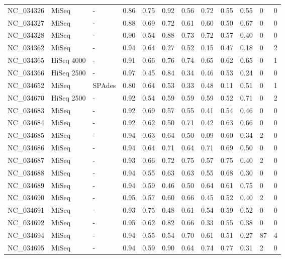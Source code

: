 \begin{table}[ht]
\begin{tabular}{llllllllllll}
  NC\_034326 & MiSeq & - & 0.86 & 0.75 & 0.92 & 0.56 & 0.72 & 0.55 & 0.55 &   0 &     0 \\ 
  NC\_034327 & MiSeq & - & 0.88 & 0.69 & 0.72 & 0.61 & 0.60 & 0.50 & 0.67 &   0 &     0 \\ 
  NC\_034328 & MiSeq & - & 0.90 & 0.54 & 0.88 & 0.73 & 0.72 & 0.57 & 0.40 &   0 &     0 \\ 
  NC\_034362 & MiSeq & - & 0.94 & 0.64 & 0.27 & 0.52 & 0.15 & 0.47 & 0.18 &   0 &     2 \\ 
  NC\_034365 & HiSeq 4000 & - & 0.91 & 0.66 & 0.76 & 0.74 & 0.65 & 0.62 & 0.65 &   0 &     1 \\ 
  NC\_034366 & HiSeq 2500 & - & 0.97 & 0.45 & 0.84 & 0.34 & 0.46 & 0.53 & 0.24 &   0 &     0 \\ 
  NC\_034652 & MiSeq & SPAdes & 0.80 & 0.64 & 0.53 & 0.33 & 0.48 & 0.11 & 0.51 &   0 &     1 \\ 
  NC\_034670 & HiSeq 2500 & - & 0.92 & 0.54 & 0.59 & 0.59 & 0.59 & 0.52 & 0.71 &   0 &     2 \\ 
  NC\_034683 & MiSeq & - & 0.92 & 0.69 & 0.57 & 0.55 & 0.41 & 0.54 & 0.46 &   0 &     0 \\ 
  NC\_034684 & MiSeq & - & 0.92 & 0.62 & 0.50 & 0.71 & 0.42 & 0.63 & 0.66 &   0 &     0 \\ 
  NC\_034685 & MiSeq & - & 0.94 & 0.63 & 0.64 & 0.50 & 0.09 & 0.60 & 0.34 &   2 &     0 \\ 
  NC\_034686 & MiSeq & - & 0.94 & 0.64 & 0.71 & 0.64 & 0.71 & 0.69 & 0.50 &   0 &     0 \\ 
  NC\_034687 & MiSeq & - & 0.93 & 0.66 & 0.72 & 0.75 & 0.57 & 0.75 & 0.40 &   2 &     0 \\ 
  NC\_034688 & MiSeq & - & 0.94 & 0.55 & 0.63 & 0.63 & 0.55 & 0.68 & 0.30 &   0 &     0 \\ 
  NC\_034689 & MiSeq & - & 0.94 & 0.59 & 0.46 & 0.50 & 0.64 & 0.61 & 0.75 &   0 &     0 \\ 
  NC\_034690 & MiSeq & - & 0.95 & 0.57 & 0.60 & 0.66 & 0.45 & 0.52 & 0.40 &   2 &     0 \\ 
  NC\_034691 & MiSeq & - & 0.93 & 0.75 & 0.48 & 0.61 & 0.54 & 0.59 & 0.52 &   0 &     0 \\ 
  NC\_034692 & MiSeq & - & 0.95 & 0.62 & 0.82 & 0.66 & 0.33 & 0.55 & 0.38 &   0 &     0 \\ 
  NC\_034694 & MiSeq & - & 0.94 & 0.55 & 0.54 & 0.70 & 0.61 & 0.51 & 0.27 &  87 &     4 \\ 
  NC\_034695 & MiSeq & - & 0.94 & 0.59 & 0.90 & 0.64 & 0.74 & 0.77 & 0.31 &   2 &     0 \\ 

\end{tabular}
\end{table}
